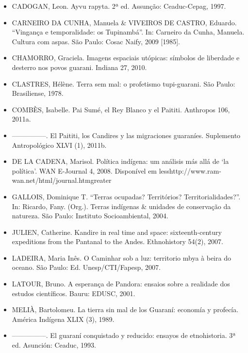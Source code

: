 \begin{itemize}
\item CADOGAN, Leon. Ayvu rapyta. 2ª ed. Assunção: Ceaduc-Cepag, 1997.

\item CARNEIRO DA CUNHA, Manuela \& VIVEIROS DE CASTRO, Eduardo.
``Vingança e temporalidade: os Tupinambá''. In: Carneiro da Cunha,
Manuela. Cultura com aspas. São Paulo: Cosac Naify, 2009 [1985].

\item CHAMORRO, Graciela. Imagens espaciais utópicas: símbolos de
liberdade e desterro nos povos guarani. Indiana 27, 2010. 

\item CLASTRES, Hélène. Terra sem mal: o profetismo tupi-guarani. São
Paulo: Brasiliense, 1978.

\item COMBÈS, Isabelle. Pai Sumé, el Rey Blanco y el Paititi. Anthropos
106, 2011a.

\item —————. El Paititi, los Candires y las migraciones guaraníes.
Suplemento Antropológico XLVI (1), 2011b.

\item DE LA CADENA, Marisol. Política indígena: um análisis más allá de
‘la política’. WAN E-Journal 4, 2008. Disponível em
{less}http://www.ram-wan.net/html/journal.htm{greater}

\item GALLOIS, Dominique T. ``Terras ocupadas? Territórios?
Territorialidades?''. In: Ricardo, Fany. (Org.). Terras indígenas \&
unidades de conservação da natureza. São Paulo: Instituto
Socioambiental, 2004.

\item JULIEN, Catherine. Kandire in real time and space:
sixteenth-century expeditions from the Pantanal to the Andes.
Ethnohistory 54(2), 2007.

\item LADEIRA, Maria Inês. O Caminhar sob a luz: territorio mbya à beira
do oceano. São Paulo: Ed. Unesp/CTI/Fapesp, 2007.

\item LATOUR, Bruno. A esperança de Pandora: ensaios sobre a realidade
dos estudos científicos. Bauru: EDUSC, 2001.

\item MELIÀ, Bartolomeu. La tierra sin mal de los Guaraní: economía y
profecía. América Indígena XLIX (3), 1989.

\item —————. El guaraní conquistado y reducido: ensayos de etnohistoria.
3ª ed. Asunción: Ceaduc, 1993.


\end{itemize}
